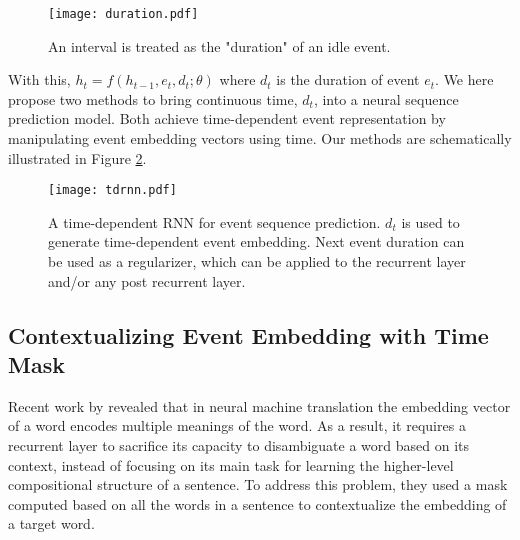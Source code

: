 \documentclass{article} %
\begin{document}
\begin{figure}[ht]
  \centering
  \texttt{[image: duration.pdf]}
  \caption{\label{timeline}An interval is treated as the "duration" of an idle event.}
\end{figure}

With this, $h_t=f(h_{t-1},e_{t},d_{t};\theta)$ where $d_{t}$ is the duration of event $e_{t}$. We here propose two methods to bring continuous time, $d_{t}$, into a neural sequence prediction model. Both achieve time-dependent event representation by manipulating event embedding vectors using time. Our methods are schematically illustrated in Figure \ref{architecture}. 



\begin{figure}[ht]
  \centering
  \texttt{[image: tdrnn.pdf]}
  \caption{\label{architecture}A time-dependent RNN for event sequence prediction. $d_{t}$ is used to generate time-dependent event embedding. Next event duration can be used as a regularizer, which can be applied to the recurrent layer and/or any post recurrent layer.}
\end{figure}

\subsection{Contextualizing Event Embedding with Time Mask}

Recent work by \citep{DBLP:journals/corr/ChoiCB16} revealed that in neural machine translation the embedding vector of a word encodes multiple meanings of the word. As a result, it requires a recurrent layer to sacrifice its capacity to disambiguate a word based on its context, instead of focusing on its main task for learning the higher-level compositional structure of a sentence. To address this problem, they used a mask computed based on all the words in a sentence to contextualize the embedding of a target word.
\end{document}
